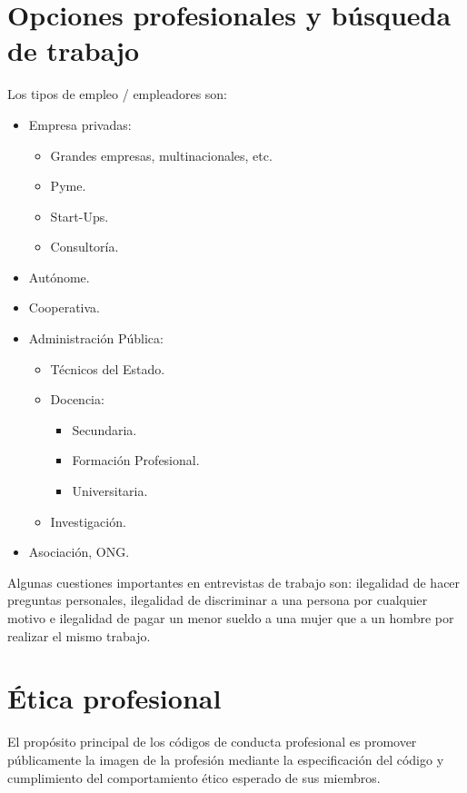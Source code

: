 \section{Opciones profesionales y búsqueda de trabajo}

Los tipos de empleo / empleadores son:
\begin{itemize}
    \item Empresa privadas:
          \begin{itemize}
              \item Grandes empresas, multinacionales, etc.
              \item Pyme.
              \item Start-Ups.
              \item Consultoría.
          \end{itemize}
    \item Autónome.
    \item Cooperativa.
    \item Administración Pública:
          \begin{itemize}
              \item Técnicos del Estado.
              \item Docencia:
                    \begin{itemize}
                        \item Secundaria.
                        \item Formación Profesional.
                        \item Universitaria.
                    \end{itemize}
              \item Investigación.
          \end{itemize}
    \item Asociación, ONG.
\end{itemize}

Algunas cuestiones importantes en entrevistas de trabajo son: ilegalidad de hacer preguntas personales, ilegalidad de discriminar a una persona por cualquier motivo e ilegalidad de pagar un menor sueldo a una mujer que a un hombre por realizar el mismo trabajo.

\section{Ética profesional}

El propósito principal de los códigos de conducta profesional es promover públicamente la imagen de la profesión mediante la especificación del código y cumplimiento del comportamiento ético esperado de sus miembros.

